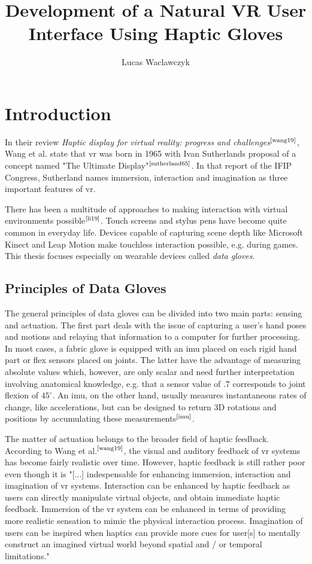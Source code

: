 \documentclass[hyperref, bachelorofscience]{cgvpub}
\author{Lucas Waclawczyk}
\title{Development of a Natural VR User Interface Using Haptic Gloves}
\newcommand{\newcite}[1]{$ ^{\text{\cite{#1}}} $}
\begin{document}
\glsaddall
	
\chapter{Introduction}
In their review \emph{Haptic display for virtual reality: progress and challenges}\newcite{wang19}, Wang et al. state that \gls{vr} was born in 1965 with Ivan Sutherlands proposal of a concept named "The Ultimate Display"\newcite{sutherland65}. In that report of the IFIP Congress, Sutherland names immersion, interaction and imagination as three important features of \acrshort{vr}. 

There has been a multitude of approaches to making interaction with virtual environments possible\newcite{li19}. Touch screens and stylus pens have become quite common in everyday life. Devices capable of capturing scene depth like Microsoft Kinect and Leap Motion make touchless interaction possible, e.g. during games. This thesis focuses especially on wearable devices called \emph{data gloves}.

\section{Principles of Data Gloves}
The general principles of data gloves can be divided into two main parts: sensing and actuation. The first part deals with the issue of capturing a user's hand poses and motions and relaying that information to a computer for further processing. In most cases, a fabric glove is equipped with an \acrfull{imu} placed on each rigid hand part or flex sensors placed on joints. The latter have the advantage of measuring absolute values which, however, are only scalar and need further interpretation involving anatomical knowledge, e.g. that a sensor value of $ .7 $ corresponds to joint flexion of $ 45^{\circ} $. An \acrfull{imu}, on the other hand, usually measures instantaneous rates of change, like accelerations, but can be designed to return 3D rotations and positions by accumulating these measurements\newcite{imu}.

The matter of actuation belongs to the broader field of haptic feedback. According to Wang et al.\newcite{wang19}, the visual and auditory feedback of \acrshort{vr} systems has become fairly realistic over time. However, haptic feedback is still rather poor even though it is "[$\dots$] indespensable for enhancing immersion, interaction and imagination of \acrshort{vr} systems. Interaction can be enhanced by haptic feedback as users can directly manipulate virtual objects, and obtain immediate haptic feedback. Immersion of the \acrshort{vr} system can be enhanced in terms of providing more realistic sensation to mimic the physical interaction process. Imagination of users can be inspired when haptics can provide more cues for user[s] to mentally construct an imagined virtual world beyond spatial and / or temporal limitations."
\end{document}
